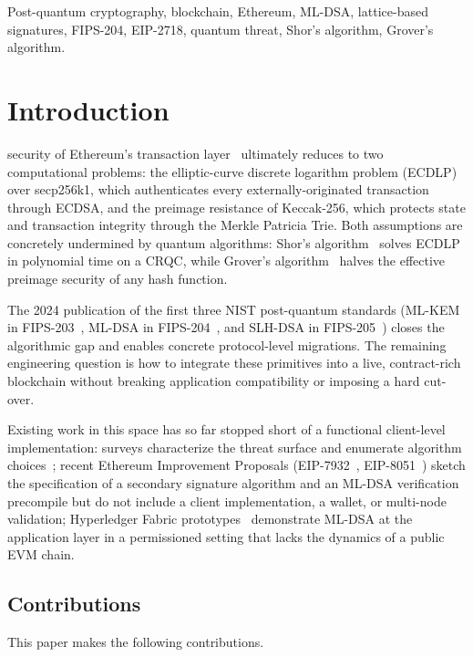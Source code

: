 \documentclass[journal,onecolumn,11pt]{IEEEtran}
\begin{document}
\begin{IEEEkeywords}
Post-quantum cryptography, blockchain, Ethereum, ML-DSA, lattice-based signatures, FIPS-204, EIP-2718, quantum threat, Shor's algorithm, Grover's algorithm.
\end{IEEEkeywords}

\section{Introduction}
\label{sec:intro}
 security of Ethereum's transaction layer~\cite{wood2014ethereum,buterin2014ethereum} ultimately reduces to two computational problems: the elliptic-curve discrete logarithm problem (ECDLP) over secp256k1, which authenticates every externally-originated transaction through ECDSA, and the preimage resistance of Keccak-256, which protects state and transaction integrity through the Merkle Patricia Trie. Both assumptions are concretely undermined by quantum algorithms: Shor's algorithm~\cite{shor1994} solves ECDLP in polynomial time on a CRQC, while Grover's algorithm~\cite{grover1996} halves the effective preimage security of any hash function.

The 2024 publication of the first three NIST post-quantum standards (ML-KEM in FIPS-203~\cite{nistfips203}, ML-DSA in FIPS-204~\cite{nistfips204}, and SLH-DSA in FIPS-205~\cite{nistfips205}) closes the algorithmic gap and enables concrete protocol-level migrations. The remaining engineering question is how to integrate these primitives into a live, contract-rich blockchain without breaking application compatibility or imposing a hard cut-over.

Existing work in this space has so far stopped short of a functional client-level implementation: surveys characterize the threat surface and enumerate algorithm choices~\cite{quantumresistance2023,berdik2023survey,kiktenko2018quantumsafe}; recent Ethereum Improvement Proposals (EIP-7932~\cite{eip7932}, EIP-8051~\cite{eip8051}) sketch the specification of a secondary signature algorithm and an ML-DSA verification precompile but do not include a client implementation, a wallet, or multi-node validation; Hyperledger Fabric prototypes~\cite{lee2024quantumsafefabric} demonstrate ML-DSA at the application layer in a permissioned setting that lacks the dynamics of a public EVM chain.

\subsection*{Contributions}
This paper makes the following contributions.
\end{document}
